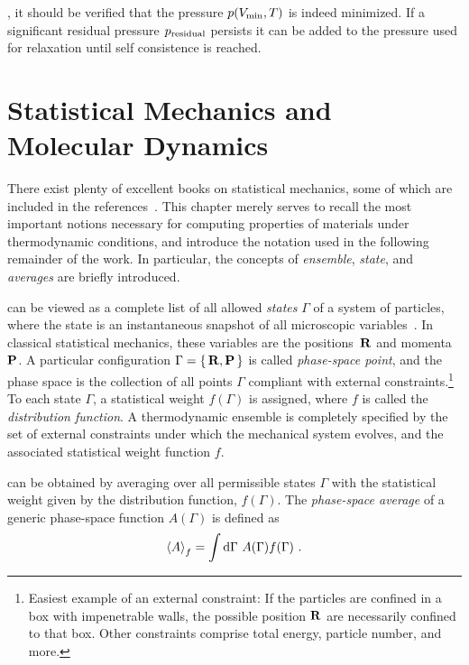 , it should be verified that the pressure $p (V_{\rm min}, T)$ is indeed minimized. If a significant residual pressure $p_{\rm residual}$ persists it can be added to the pressure used for relaxation until self consistence is reached.

\newpage

\section{Statistical Mechanics and Molecular Dynamics}
There exist plenty of excellent books on statistical mechanics, some of which are included in the references~\cite{Phillies2012,Tuckerman,Schrodinger1989}. This chapter merely serves to recall the most important notions necessary for computing properties of materials under thermodynamic conditions, and introduce the notation used in the following remainder of the work. In particular, the concepts of \emph{ensemble}, \emph{state}, and \emph{averages} are briefly introduced.

 can be viewed as a complete list of all allowed \emph{states} $\Gamma$ of a system of particles, where the state is an instantaneous snapshot of all microscopic variables~\cite{Phillies2012}. In classical statistical mechanics, these variables are the positions~${\bf R}$ and momenta~${\bf P}$. A particular configuration $\Gamma = \set{{\bf R}, {\bf P}}$ is called \emph{phase-space point}, and the phase space is the collection of all points $\Gamma$ compliant with external constraints.\footnote{Easiest example of an external constraint: If the particles are confined in a box with impenetrable walls, the possible position ${\bf R}$ are necessarily confined to that box. Other constraints comprise total energy, particle number, and more.} To each state $\Gamma$, a statistical weight $f (\Gamma)$ is assigned, where $f$ is called the \emph{distribution function}. A thermodynamic ensemble is completely specified by the set of external constraints under which the mechanical system evolves, and the associated statistical weight function $f$.

 can be obtained by averaging over all permissible states $\Gamma$ with the statistical weight given by the distribution function, $f (\Gamma)$. The \emph{phase-space average} of a generic phase-space function $A (\Gamma)$ is defined as
\begin{align}
  \braket{A}_f 
    = \int \d \Gamma ~ A(\Gamma) f (\Gamma)~.
  \label{eq:phase.space.average}
\end{align}

